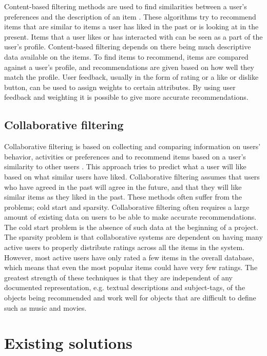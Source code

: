 Content-based filtering methods are used to find similarities between a user's preferences and the description of an item \cite{HM5}. These algorithms try to recommend items that are similar to items a user has liked in the past or is looking at in the present. Items that a user likes or has interacted with can be seen as a part of the user's profile. Content-based filtering depends on there being much descriptive data available on the items. To find items to recommend, items are compared against a user's profile, and recommendations are given based on how well they match the profile. User feedback, usually in the form of rating or a like or dislike button, can be used to assign weights to certain attributes. By using user feedback and weighting it is possible to give more accurate recommendations. \cite{HM4}

\subsection{Collaborative filtering}
\label{subsec:prestudy_collaborative}

Collaborative filtering is based on collecting and comparing information on users' behavior, activities or preferences and to recommend items based on a user's similarity to other users \cite{HM6}. This approach tries to predict what a user will like based on what similar users have liked. Collaborative filtering assumes that users who have agreed in the past will agree in the future, and that they will like similar items as they liked in the past. These methods often suffer from the problems; cold start and sparsity. Collaborative filtering often requires a large amount of existing data on users to be able to make accurate recommendations. The cold start problem is the absence of such data at the beginning of a project. The sparsity problem is that collaborative systems are dependent on having many active users to properly distribute ratings across all the items in the system. However, most active users have only rated a few items in the overall database, which means that even the most popular items could have very few ratings. The greatest strength of these techniques is that they are independent of any documented representation, e.g. textual descriptions and subject-tags, of the objects being recommended and work well for objects that are difficult to define such as music and movies.\cite{HM4}

\section{Existing solutions}
\label{sec:existing_solutions}


